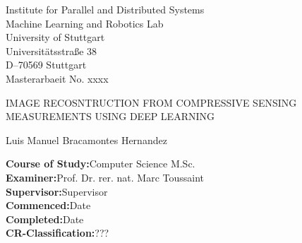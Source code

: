\begin{titlepage}

\centering
\sffamily
%
\small
Institute for Parallel and Distributed Systems \\
Machine Learning and Robotics Lab\\
\null\vspace{0.5cm}
University of Stuttgart\\
Universitätsstraße 38\\
D–70569 Stuttgart\\

\null\vspace{0.9cm}
Masterarbaeit No. xxxx

\large
\null\vspace{0.8cm}
{\huge IMAGE RECOSNTRUCTION FROM COMPRESSIVE SENSING MEASUREMENTS USING DEEP LEARNING\\[12pt] 
} 
\null\vspace{0.1cm}

\small
Luis Manuel Bracamontes Hernandez

\raggedright
\null\vspace{0.7cm}
\textbf{Course of Study:}\null\hspace{0.1cm}Computer Science M.Sc.\\
\null\vspace{0.5cm}
\textbf{Examiner:}\null\hspace{0.1cm}Prof. Dr. rer. nat. Marc Toussaint\\
\null\vspace{0.01cm}
\textbf{Supervisor:}\null\hspace{0.1cm}Supervisor\\
\null\vspace{0.5cm}
\textbf{Commenced:}\null\hspace{0.1cm}Date\\
\null\vspace{0.01cm}
\textbf{Completed:}\null\hspace{0.1cm}Date\\
\null\vspace{0.5cm}
\textbf{CR-Classification:}\null\hspace{0.1cm}???\\


\vspace{0.5cm}
\end{titlepage}



